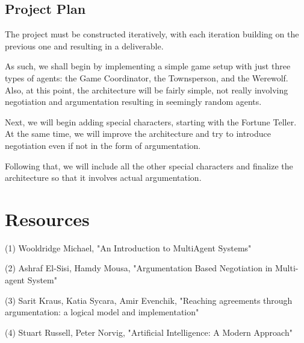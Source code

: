 \documentclass{article}
\begin{document}
\subsection{Project Plan}

The project must be constructed iteratively, with each iteration building on the previous one and resulting in a deliverable.

As such, we shall begin by implementing a simple game setup with just three types of agents: the Game Coordinator, the Townsperson, and the Werewolf. Also, at this point, the architecture will be fairly simple, not really involving negotiation and argumentation resulting in seemingly random agents.

Next, we will begin adding special characters, starting with the Fortune Teller. At the same time, we will improve the architecture and try to introduce negotiation even if not in the form of argumentation.

Following that, we will include all the other special characters and finalize the architecture so that it involves actual argumentation.

\section{Resources}

\noindent
(1) Wooldridge Michael, "An Introduction to MultiAgent Systems"

\noindent
(2) Ashraf El-Sisi, Hamdy Mousa, "Argumentation Based Negotiation in Multi-agent System"

\noindent
(3) Sarit Kraus, Katia Sycara, Amir Evenchik, "Reaching agreements through argumentation: a logical model and implementation"

\noindent
(4) Stuart Russell, Peter Norvig, "Artificial Intelligence: A Modern Approach"
\end{document}
